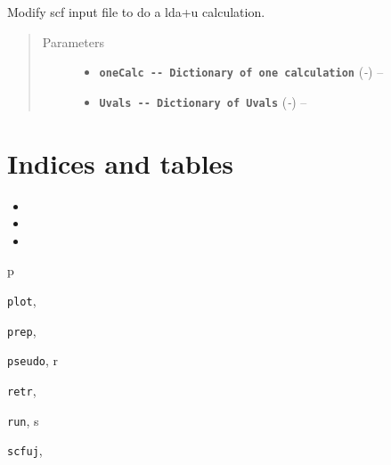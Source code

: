 \documentclass[letterpaper,10pt,english]{sphinxmanual}
\begin{document}

\begin{fulllineitems}
\label{scfuj:scfuj.updateUvals}
Modify scf input file to do a lda+u calculation.
\begin{quote}\begin{description}
\item[{Parameters}] \leavevmode\begin{itemize}
\item {} 
\textbf{\texttt{oneCalc      -{-} Dictionary of one calculation}} (\emph{-}) -- 

\item {} 
\textbf{\texttt{Uvals        -{-} Dictionary of Uvals}} (\emph{-}) -- 

\end{itemize}

\end{description}\end{quote}

\end{fulllineitems}



\chapter{Indices and tables}
\label{index:indices-and-tables}\begin{itemize}
\item {} 

\item {} 

\item {} 

\end{itemize}


\renewcommand{\indexname}{Python Module Index}
\begin{theindex}
\def\bigletter#1{{\Large\sffamily#1}\nopagebreak\vspace{1mm}}
\bigletter{p}
\item {\texttt{plot}}, \pageref{plot:module-plot}
\item {\texttt{prep}}, \pageref{prep:module-prep}
\item {\texttt{pseudo}}, \pageref{pseudo:module-pseudo}
\indexspace
\bigletter{r}
\item {\texttt{retr}}, \pageref{retr:module-retr}
\item {\texttt{run}}, \pageref{run:module-run}
\indexspace
\bigletter{s}
\item {\texttt{scfuj}}, \pageref{scfuj:module-scfuj}
\end{theindex}

\renewcommand{\indexname}{Index}
\printindex
\end{document}
